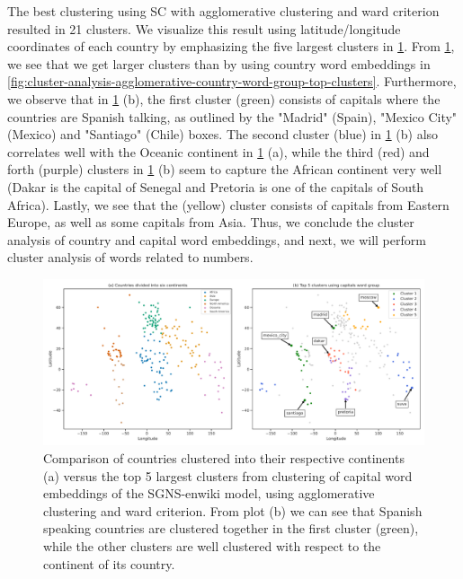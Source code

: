 The best clustering using SC with agglomerative clustering and ward criterion resulted in 21 clusters. We visualize this result using latitude/longitude coordinates of each country by emphasizing the five largest clusters in \cref{fig:cluster-analysis-agglomerative-country-capitals-word-group-top-clusters}. From \cref{fig:cluster-analysis-agglomerative-country-capitals-word-group-top-clusters}, we see that we get larger clusters than by using country word embeddings in \cref{fig:cluster-analysis-agglomerative-country-word-group-top-clusters}. Furthermore, we observe that in \cref{fig:cluster-analysis-agglomerative-country-capitals-word-group-top-clusters} (b), the first cluster (green) consists of capitals where the countries are Spanish talking, as outlined by the "Madrid" (Spain), "Mexico City" (Mexico) and "Santiago" (Chile) boxes. The second cluster (blue) in \cref{fig:cluster-analysis-agglomerative-country-capitals-word-group-top-clusters} (b) also correlates well with the Oceanic continent in \cref{fig:cluster-analysis-agglomerative-country-capitals-word-group-top-clusters} (a), while the third (red) and forth (purple) clusters in \cref{fig:cluster-analysis-agglomerative-country-capitals-word-group-top-clusters} (b) seem to capture the African continent very well (Dakar is the capital of Senegal and Pretoria is one of the capitals of South Africa). Lastly, we see that the (yellow) cluster consists of capitals from Eastern Europe, as well as some capitals from Asia. Thus, we conclude the cluster analysis of country and capital word embeddings, and next, we will perform cluster analysis of words related to numbers.
\begin{figure}[H]
    \centering
    \includegraphics[width=\textwidth]{thesis/figures/cluster-analysis-agglomerative-country-capitals-word-group-top-clusters.pdf}
    \caption{Comparison of countries clustered into their respective continents (a) versus the top 5 largest clusters from clustering of capital word embeddings of the SGNS-enwiki model, using agglomerative clustering and ward criterion. From plot (b) we can see that Spanish speaking countries are clustered together in the first cluster (green), while the other clusters are well clustered with respect to the continent of its country.}
    \label{fig:cluster-analysis-agglomerative-country-capitals-word-group-top-clusters}
\end{figure}

